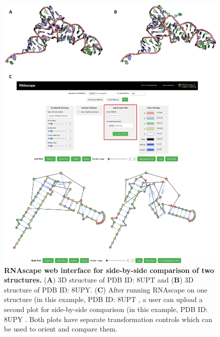 \begin{center}
\begin{figure}[H]
  \includegraphics[width=\linewidth]{./rnascapefigs/figureS2.png}
    \caption[RNAscape web interface for side-by-side comparison of two structures.]{\textbf{RNAscape web interface for side-by-side comparison of two structures.} ({\bf A}) 3D structure of PDB ID: 8UPT and ({\bf B}) 3D structure of PDB ID: 8UPY. ({\bf C}) After running RNAscape on one structure (in this example, PDB ID: 8UPT \citep{Krahn2024}, a user can upload a second plot for side-by-side comparison (in this example, PDB ID: 8UPY \citep{Krahn2024}. Both plots have separate transformation controls which can be used to orient and compare them.}
  \label{fig:rnascapeS2}
\end{figure}
\end{center}

